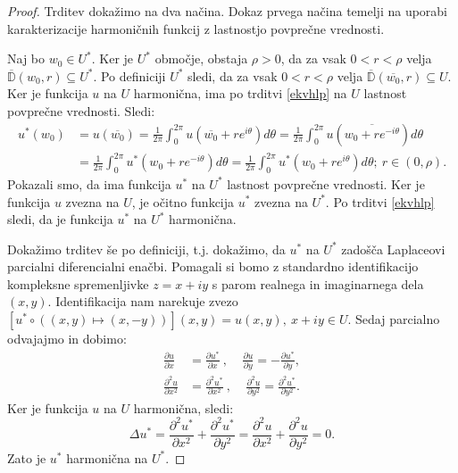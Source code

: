 \documentclass[mat1]{fmfdelo}
\begin{document}
    \begin{proof}
        Trditev dokažimo na dva načina. Dokaz prvega načina temelji na uporabi karakterizacije harmoničnih funkcij z lastnostjo povprečne vrednosti. 
        
        Naj bo \mbox{$w_0 \in U^*$}. Ker je $U^*$ območje, obstaja $\rho>0$, da za vsak $0 < r < \rho$ velja $\overline{\mathbb{D}}(w_0, r) \subseteq U^*$. Po definiciji $U^*$ sledi, da za vsak \mbox{$0 < r < \rho$} velja $\overline{\mathbb{D}}(\overline{w_0}, r) \subseteq U$. 
        Ker je funkcija $u$ na $U$ harmonična, ima po trditvi \ref{ekvhlp} na $U$ lastnost povprečne vrednosti. Sledi:
        \begin{align*}
            u^*(w_0) & = u(\overline{w_0}) = \frac{1}{2 \pi} \int_{0}^{2 \pi}{u\left(\overline{w_0} + r e^{i \theta}\right) d\theta} = \frac{1}{2 \pi} \int_{0}^{2 \pi}{u\left(\overline{w_0 + r e^{-i \theta}}\right) d\theta}\\
            &= \frac{1}{2 \pi} \int_{0}^{2 \pi}{u^*\left(w_0 + r e^{-i \theta}\right) d\theta} = \frac{1}{2 \pi} \int_{0}^{2 \pi}{u^*\left(w_0 + r e^{i \theta}\right) d\theta};~r \in (0, \rho).
        \end{align*} 
        Pokazali smo, da ima funkcija $u^*$ na $U^*$ lastnost povprečne vrednosti. 
        Ker je funkcija $u$ zvezna na $U$, je očitno funkcija $u^*$ zvezna na $U^*$. 
        Po trditvi \ref{ekvhlp} sledi, da je funkcija $u^*$ na $U^*$ harmonična. 
        
        Dokažimo trditev še po definiciji, t.j. dokažimo, da $u^*$ na $U^*$ zadošča Laplaceovi parcialni diferencialni enačbi.
        Pomagali si bomo z standardno identifikacijo kompleksne spremenljivke $z = x + iy$ s parom realnega in imaginarnega dela $(x,y)$.
        Identifikacija nam narekuje zvezo $[u^* \circ ((x,y) \mapsto (x,-y))](x, y) = u(x, y),~ x + iy \in U$.
        Sedaj parcialno odvajajmo in dobimo:
        \begin{align*}
            \frac{\partial u}{\partial x} &= \frac{\partial u^* }{\partial x}~,~~~~~\frac{\partial u}{\partial y} = - \frac{\partial u^* }{\partial y}, \\
            \frac{\partial^2 u}{\partial x^2} & = \frac{\partial^2 u^* }{\partial x^2}~,~~~~~\frac{\partial^2 u}{\partial y^2} = \frac{\partial^2 u^* }{\partial y^2}.
        \end{align*}
        Ker je funkcija $u$ na $U$ harmonična, sledi:
        $$
            \Delta u^* = \frac{\partial^2 u^*}{\partial x^2} + \frac{\partial^2 u^*}{\partial y^2} = \frac{\partial^2 u}{\partial x^2} + \frac{\partial^2 u}{\partial y^2} = 0.
        $$
        Zato je $u^*$ harmonična na $U^*$.
    \end{proof}
\end{document}

